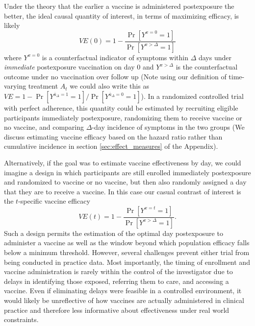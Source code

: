 \documentclass[11pt]{article}
\begin{document}
Under the theory that the earlier a vaccine is administered postexposure the better, the ideal causal quantity of interest, in terms of maximizing efficacy, is likely
$$VE(0) = 1 - \frac{\Pr[Y^{x = 0} = 1]}{\Pr[Y^{x > \Delta} = 1]}$$
where $Y^{x = 0}$ is a counterfactual indicator of symptoms within $\Delta$ days under \textit{immediate} postexposure vaccination on day 0 and $Y^{x > \Delta}$ is the counterfactual outcome under no vaccination over follow up (Note using our definition of time-varying treatment $A_t$ we could also write this as $VE = 1 - \Pr[Y^{\overline{a}_{\Delta} = 1} = 1]/\Pr[Y^{\overline{a}_{\Delta} = 0} = 1]$). In a randomized controlled trial with perfect adherence, this quantity could be estimated by recruiting eligible participants immediately postexposure, randomizing them to receive vaccine or no vaccine, and comparing $\Delta$-day incidence of symptoms in the two groups (We discuss estimating vaccine efficacy based on the hazard ratio rather than cumulative incidence in section \ref{sec:effect_measures} of the Appendix). 

Alternatively, if the goal was to estimate vaccine effectiveness by day, we could imagine a design in which participants are still enrolled immediately postexposure and randomized to vaccine or no vaccine, but then also randomly assigned a day that they are to receive a vaccine. In this case our casual contrast of interest is the $t$-specific vaccine efficacy
$$VE(t) = 1 - \frac{\Pr[Y^{x = t} = 1]}{\Pr[Y^{x > \Delta} = 1]}.$$
Such a design permits the estimation of the optimal day postexposure to administer a vaccine as well as the window beyond which population efficacy falls below a minimum threshold. However, several challenges prevent either trial from being conducted in practice data. Most importantly, the timing of enrollment and vaccine administration is rarely within the control of the investigator due to delays in identifying those exposed, referring them to care, and accessing a vaccine. Even if eliminating delays were feasible in a controlled environment, it would likely be unreflective of how vaccines are actually administered in clinical practice and therefore less informative about effectiveness under real world constraints. 
\end{document}
